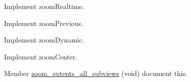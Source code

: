 \begin{DoxyRefList}
\label{todo__todo000122}%
%
Implement zoom\+Realtime. 

\label{todo__todo000121}%
%
Implement zoom\+Previous. 

\label{todo__todo000120}%
%
Implement zoom\+Dynamic. 

\label{todo__todo000119}%
%
Implement zoom\+Center.  
\item[Member \mbox{\hyperlink{imgui__main_8c_a6e94b00a9d38e575f3404ff95c879ed8}{zoom\+\_\+extents\+\_\+all\+\_\+subviews}} (void)]\label{todo__todo000013}%
%
document this. 
\end{DoxyRefList}